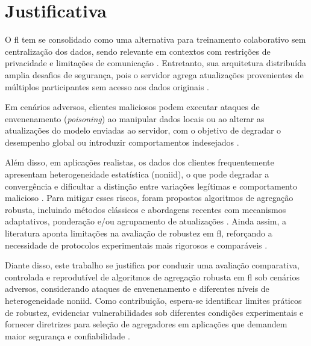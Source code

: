 \chapter{Justificativa}
\label{chap:justificativa}

O \gls{fl} tem se consolidado como uma alternativa para treinamento colaborativo sem centralização dos dados, sendo relevante em contextos com restrições de privacidade e limitações de comunicação \cite{Kairouz2021,Li2020,Yang2019}. Entretanto, sua arquitetura distribuída amplia desafios de segurança, pois o servidor agrega atualizações provenientes de múltiplos participantes sem acesso aos dados originais \cite{Sikandar2023,Mothukuri2021,Lyu2020}.

Em cenários adversos, clientes maliciosos podem executar ataques de envenenamento (\textit{poisoning}) ao manipular dados locais ou ao alterar as atualizações do modelo enviadas ao servidor, com o objetivo de degradar o desempenho global ou introduzir comportamentos indesejados \cite{Biggio2012,Bhagoji2019}.

Além disso, em aplicações realistas, os dados dos clientes frequentemente apresentam heterogeneidade estatística (\gls{noniid}), o que pode degradar a convergência e dificultar a distinção entre variações legítimas e comportamento malicioso \cite{Zhao2018,Li2020}. Para mitigar esses riscos, foram propostos algoritmos de agregação robusta, incluindo métodos clássicos e abordagens recentes com mecanismos adaptativos, ponderação e/ou agrupamento de atualizações \cite{Blanchard2017,Yin2018}. Ainda assim, a literatura aponta limitações na avaliação de robustez em \gls{fl}, reforçando a necessidade de protocolos experimentais mais rigorosos e comparáveis \cite{Khan2023,Kairouz2021}.

Diante disso, este trabalho se justifica por conduzir uma avaliação comparativa, controlada e reprodutível de algoritmos de agregação robusta em \gls{fl} sob cenários adversos, considerando ataques de envenenamento e diferentes níveis de heterogeneidade \gls{noniid}. Como contribuição, espera-se identificar limites práticos de robustez, evidenciar vulnerabilidades sob diferentes condições experimentais e fornecer diretrizes para seleção de agregadores em aplicações que demandem maior segurança e confiabilidade \cite{Khan2023,Sikandar2023,Zhang2025}.
